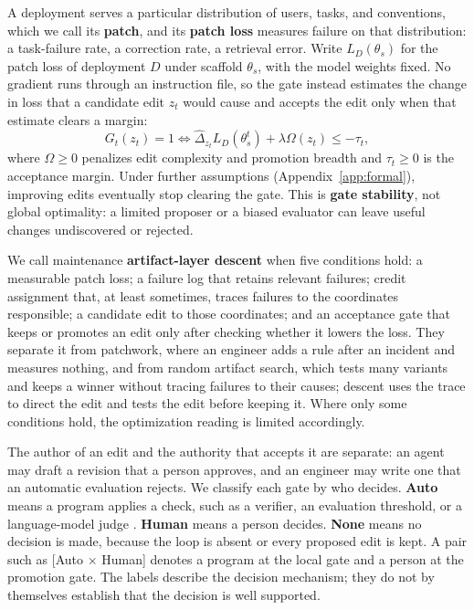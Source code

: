 A deployment serves a particular distribution of users, tasks, and conventions, which we call its \textbf{patch}, and its \textbf{patch loss} measures failure on that distribution: a task-failure rate, a correction rate, a retrieval error. Write \(L_D(\theta_s)\) for the patch loss of deployment \(D\) under scaffold \(\theta_s\), with the model weights fixed. No gradient runs through an instruction file, so the gate instead estimates the change in loss that a candidate edit \(z_t\) would cause and accepts the edit only when that estimate clears a margin: \[G_t(z_t)=1\iff\widehat{\Delta}_{z_t}L_D(\theta_s^t)+\lambda\Omega(z_t)\leq-\tau_t,\] where \(\Omega\geq0\) penalizes edit complexity and promotion breadth and \(\tau_t\geq0\) is the acceptance margin. Under further assumptions (Appendix~\ref{app:formal}), improving edits eventually stop clearing the gate. This is \textbf{gate stability}, not global optimality: a limited proposer or a biased evaluator can leave useful changes undiscovered or rejected.

We call maintenance \textbf{artifact-layer descent} when five conditions hold: a measurable patch loss; a failure log that retains relevant failures; credit assignment that, at least sometimes, traces failures to the coordinates responsible; a candidate edit to those coordinates; and an acceptance gate that keeps or promotes an edit only after checking whether it lowers the loss. They separate it from patchwork, where an engineer adds a rule after an incident and measures nothing, and from random artifact search, which tests many variants and keeps a winner without tracing failures to their causes; descent uses the trace to direct the edit and tests the edit before keeping it. Where only some conditions hold, the optimization reading is limited accordingly.

The author of an edit and the authority that accepts it are separate: an agent may draft a revision that a person approves, and an engineer may write one that an automatic evaluation rejects. We classify each gate by who decides. \textbf{Auto} means a program applies a check, such as a verifier, an evaluation threshold, or a language-model judge \citep{zheng2023judge}. \textbf{Human} means a person decides. \textbf{None} means no decision is made, because the loop is absent or every proposed edit is kept. A pair such as {[}Auto \(\times\) Human{]} denotes a program at the local gate and a person at the promotion gate. The labels describe the decision mechanism; they do not by themselves establish that the decision is well supported.

